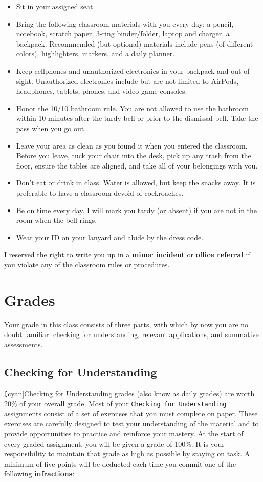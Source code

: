 \documentclass{article}
\begin{document}
\begin{itemize}
\setlength\itemsep{0.1ex}
    \item Sit in your assigned seat.
    \item Bring the following classroom materials with you every day: a pencil, notebook, scratch paper, 3-ring binder/folder, laptop and charger, a backpack. Recommended (but optional) materials include pens (of different colors), highlighters, markers, and a daily planner. 
    \item Keep cellphones and unauthorized electronics in your backpack and out of sight. Unauthorized electronics include but are not limited to AirPods, headphones, tablets, phones, and video game consoles.
    \item Honor the 10/10 bathroom rule. You are not allowed to use the bathroom within 10 minutes after the tardy bell or prior to the dismissal bell. Take the pass when you go out.
    \item Leave your area as clean as you found it when you entered the classroom. Before you leave, tuck your chair into the desk, pick up any trash from the floor, ensure the tables are aligned, and take all of your belongings with you.
    \item Don't eat or drink in class. Water is allowed, but keep the snacks away. It is preferable to have a classroom devoid of cockroaches.
    \item Be on time every day. I will mark you tardy (or absent) if you are not in the room when the bell rings.
    \item Wear your ID on your lanyard and abide by the dress code.
\end{itemize}

I reserved the right to write you up in a \textbf{minor incident} or \textbf{office referral} if you violate any of the classroom rules or procedures. 


\section{Grades}
Your grade in this class consists of three parts, with which by now you are no doubt familiar: checking for understanding, relevant applications, and summative assessments.

\subsection{Checking for Understanding}

\texttt[cyan]{Checking for Understanding} grades (also know as daily grades) are worth 20\% of your overall grade. Most of your \texttt{Checking for Understanding} assignments consist of a set of exercises that you must complete on paper. These exercises are carefully designed to test your understanding of the material and to provide opportunities to practice and reinforce your mastery. At the start of every graded assignment, you will be given a grade of 100\%. It is your responsibility to maintain that grade as high as possible by staying on task. A minimum of five points will be deducted each time you commit one of the following \textbf{infractions}:
\end{document}
